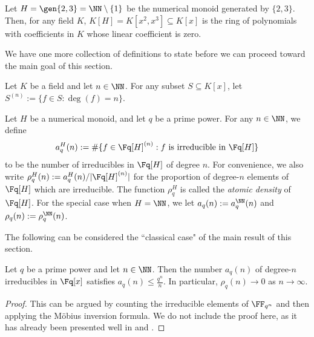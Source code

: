 \begin{eg}
Let $H = \gen{2,3} = \NN \setminus \{1\}$ be the numerical monoid generated by $\{2,3\}$.
Then, for any field $K$, $K[H] = K[x^2,x^3] \subseteq K[x]$ is the ring of polynomials with coefficients in $K$ whose linear coefficient is zero.
\end{eg}

We have one more collection of definitions to state before we can proceed toward the main goal of this section.

\begin{defn}
Let $K$ be a field and let $n\in \NN$.
For any subset $S \subseteq K[x]$, let $S^{(n)} := \{f\in S: \deg(f) = n\}$.

Let $H$ be a numerical monoid, and let $q$ be a prime power.
For any $n\in \NN$, we define 
\[a_q^H(n) := \#\{f\in \Fq[H]^{(n)}: f \textrm{ is irreducible in } \Fq[H] \}\]
to be the number of irreducibles in $\Fq[H]$ of degree $n$.
For convenience, we also write $\rho_q^H(n) := a_q^H(n)/|\Fq[H]^{(n)}|$ for the proportion of degree-$n$ elements of $\Fq[H]$ which are irreducible.
The function $\rho_q^H$ is called the \textit{atomic density} of $\Fq[H]$.
For the special case when $H = \NN$, we let $a_q(n) := a_q^\NN(n)$ and $\rho_q(n) := \rho_q^\NN(n)$.
\end{defn}

The following can be considered the ``classical case" of the main result of this section.

\begin{prop}\label{prop:atoms in Fqx}
Let $q$ be a prime power and let $n\in \NN$.
Then the number $a_q(n)$ of degree-$n$ irreducibles in $\Fq[x]$ satisfies $a_q(n) \le \frac{q^n}{n}$.
In particular, $\rho_q(n) \to 0$ as $n\to\infty$.
\end{prop}

\begin{proof}
This can be argued by counting the irreducible elements of $\FF_{q^n}$ and then applying the M\"{o}bius inversion formula.
We do not include the proof here, as it has already been presented well in \cite[Section 14.3]{dummit-foote91} and \cite[Section 2.3]{lidl-niederreiter97}.
\end{proof}


